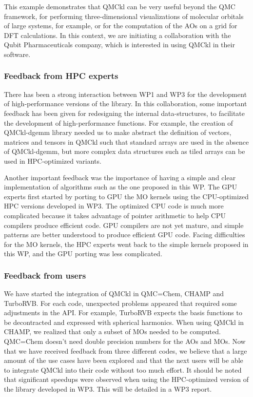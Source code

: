 This example demonstrates that QMCkl can be very useful beyond the \ac{QMC}
framework, for performing three-dimensional visualizations of molecular
orbitals of large systems, for example, or for the computation of the
\acp{AO} on a grid for \ac{DFT} calculations. In this context, we are
initiating a collaboration with the Qubit Pharmaceuticals company,
which is interested in using QMCkl in their software.

\subsubsection{Feedback from HPC experts}

There has been a strong interaction between WP1 and WP3 for the
development of high-performance versions of the library. In this
collaboration, some important feedback has been given for redesigning
the internal data-structures, to facilitate the development of
high-performance functions. 
For example, the creation of QMCkl-dgemm library needed us to make abstract the
definition of vectors, matrices and tensors in QMCkl such that standard
arrays are used in the absence of QMCkl-dgemm, but more complex data
structures such as tiled arrays can be used in HPC-optimized variants.

Another important feedback was the importance of having a simple and clear
implementation of algorithms such as the one proposed in this \ac{WP}.
The GPU experts first started by porting to GPU the \ac{MO} kernels
using the CPU-optimized HPC versions developed in WP3. The optimized CPU code
is much more complicated because it takes advantage of pointer arithmetic to help
CPU compilers produce efficient code. GPU compilers are not yet mature, and simple
patterns are better understood to produce efficient GPU code. Facing difficulties
for the \ac{MO} kernels, the HPC experts went back to the simple kernels
proposed in this \ac{WP}, and the GPU porting was less complicated.


\subsubsection{Feedback from users}

We have started the integration of QMCkl in QMC=Chem, CHAMP and
TurboRVB. For each code, unexpected problems appeared that required some
adjustments in the \ac{API}. For example, TurboRVB expects the basis functions
to be decontracted and expressed with spherical harmonics.
When using QMCkl in CHAMP, we realized that only a subset of \acp{MO}
needed to be computed. QMC=Chem doesn't need double precision numbers for the
\acp{AO} and \acp{MO}. Now that we have received feedback from three different
codes, we believe that a large amount of the use cases have been explored and that the
next users will be able to integrate QMCkl into their code without too much
effort. It should be noted that significant speedups were observed when using
the HPC-optimized version of the library developed in WP3. This will be detailed
in a WP3 report.

